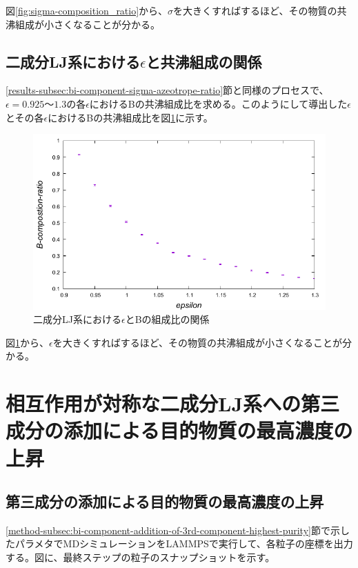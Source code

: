 \documentclass[titlepage]{jsreport}
\begin{document}
図\ref{fig:sigma-composition_ratio}から、$\sigma$を大きくすればするほど、その物質の共沸組成が小さくなることが分かる。

\newpage
\subsection{二成分LJ系における$\epsilon$と共沸組成の関係} \label{results-subsec:bi-component-epsilon-azeotrope-ratio}
\ref{results-subsec:bi-component-sigma-azeotrope-ratio}節と同様のプロセスで、$\epsilon=0.925〜1.3$の各$\epsilon$におけるBの共沸組成比を求める。このようにして導出した$\epsilon$とその各$\epsilon$におけるBの共沸組成比を図\ref{fig:epsilon-composition_ratio}に示す。

\begin{figure}[htbp]
    \begin{center}
        \includegraphics[width=14cm]{fig/epsilon-composition_ratio/epsilon-composition_ratio.pdf}
    \end{center}
    \caption{二成分LJ系における$\epsilon$とBの組成比の関係}
    \label{fig:epsilon-composition_ratio}
\end{figure}

図\ref{fig:epsilon-composition_ratio}から、$\epsilon$を大きくすればするほど、その物質の共沸組成が小さくなることが分かる。


\newpage
\section{相互作用が対称な二成分LJ系への第三成分の添加による目的物質の最高濃度の上昇} \label{results-sec:bi-component-addition-of-3rd-component-highest-purity}
\subsection{第三成分の添加による目的物質の最高濃度の上昇} \label{results-subsec:bi-component-addition-of-3rd-component-highest-purity}
\ref{method-subsec:bi-component-addition-of-3rd-component-highest-purity}節で示したパラメタでMDシミュレーションをLAMMPSで実行して、各粒子の座標を出力する。図に、最終ステップの粒子のスナップショットを示す。
\end{document}
